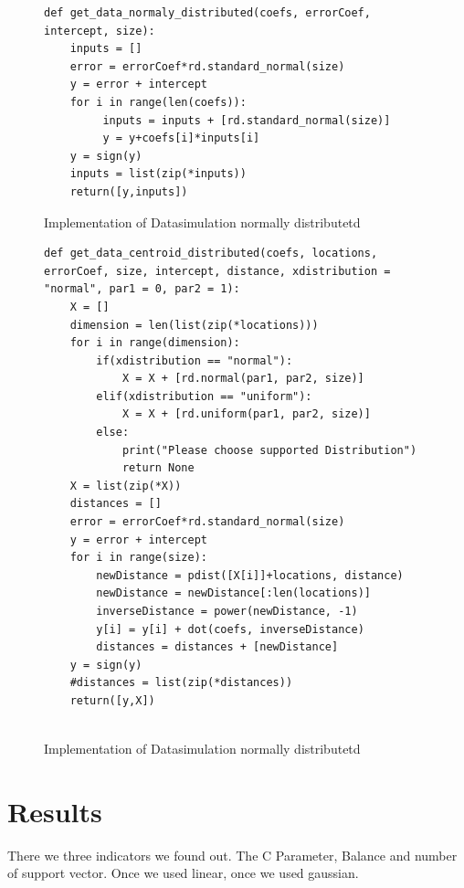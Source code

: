 \documentclass[letterpaper]{article}
\begin{document}
\begin{figure}[!htb]
\begin{center}
\begin{lstlisting}
def get_data_normaly_distributed(coefs, errorCoef, intercept, size):
	inputs = []
	error = errorCoef*rd.standard_normal(size)
	y = error + intercept
	for i in range(len(coefs)):
		 inputs = inputs + [rd.standard_normal(size)]		 
		 y = y+coefs[i]*inputs[i]
	y = sign(y)
	inputs = list(zip(*inputs))
	return([y,inputs])
\end{lstlisting}
\caption{Implementation of Datasimulation normally distributetd}
\label{fig1}
\end{center}
\end{figure}

\begin{figure}[!htb]
\begin{center}
\begin{lstlisting}
def get_data_centroid_distributed(coefs, locations, errorCoef, size, intercept, distance, xdistribution = "normal", par1 = 0, par2 = 1):
	X = []
	dimension = len(list(zip(*locations)))
	for i in range(dimension):
		if(xdistribution == "normal"):		
			X = X + [rd.normal(par1, par2, size)]
		elif(xdistribution == "uniform"):
			X = X + [rd.uniform(par1, par2, size)]
		else:
			print("Please choose supported Distribution")
			return None	
	X = list(zip(*X))
	distances = []
	error = errorCoef*rd.standard_normal(size)
	y = error + intercept
	for i in range(size):	
		newDistance = pdist([X[i]]+locations, distance)
		newDistance = newDistance[:len(locations)]
		inverseDistance = power(newDistance, -1)
		y[i] = y[i] + dot(coefs, inverseDistance)
		distances = distances + [newDistance]
	y = sign(y)
	#distances = list(zip(*distances))
	return([y,X])	
	
\end{lstlisting}
\caption{Implementation of Datasimulation normally distributetd}
\label{fig1}
\end{center}
\end{figure}




\section{Results}

There we three indicators we found out. The C Parameter, Balance and number of support vector. Once we used linear, once we used gaussian.
\end{document}
